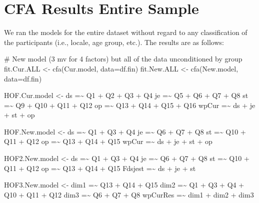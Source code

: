 \documentclass[
  letterpaper,
  DIV=11,
  numbers=noendperiod]{scrartcl}
\newenvironment{Shaded}{\begin{snugshade}}{\end{snugshade}}
\newcommand{\AttributeTok}[1]{\textcolor[rgb]{0.40,0.45,0.13}{#1}}
\newcommand{\CommentTok}[1]{\textcolor[rgb]{0.37,0.37,0.37}{#1}}
\newcommand{\FunctionTok}[1]{\textcolor[rgb]{0.28,0.35,0.67}{#1}}
\newcommand{\NormalTok}[1]{\textcolor[rgb]{0.00,0.23,0.31}{#1}}
\newcommand{\OtherTok}[1]{\textcolor[rgb]{0.00,0.23,0.31}{#1}}
\newcommand{\StringTok}[1]{\textcolor[rgb]{0.13,0.47,0.30}{#1}}
\begin{document}
\section{CFA Results Entire Sample}\label{cfa-results-entire-sample}

We ran the models for the entire dataset without regard to any
classification of the participants (i.e., locale, age group, etc.). The
results are as follows:

\begin{Shaded}
\begin{Highlighting}[]
\CommentTok{\# New model (3 mv for 4 factors) but all of the data unconditioned by group}
\NormalTok{fit.Cur.ALL }\OtherTok{\textless{}{-}} \FunctionTok{cfa}\NormalTok{(Cur.model, }\AttributeTok{data=}\NormalTok{df.fin)}
\NormalTok{fit.New.ALL }\OtherTok{\textless{}{-}} \FunctionTok{cfa}\NormalTok{(New.model, }\AttributeTok{data=}\NormalTok{df.fin)}

\NormalTok{HOF.Cur.model }\OtherTok{\textless{}{-}}  \StringTok{\textquotesingle{}ds =\textasciitilde{} Q1 + Q2 + Q3 + Q4}
\StringTok{                  je =\textasciitilde{} Q5 + Q6 + Q7 + Q8}
\StringTok{                  st =\textasciitilde{} Q9 + Q10 + Q11 + Q12}
\StringTok{                  op =\textasciitilde{} Q13 + Q14 + Q15 + Q16}
\StringTok{                  wpCur =\textasciitilde{} ds + je + st + op\textquotesingle{}}

\NormalTok{HOF.New.model }\OtherTok{\textless{}{-}} \StringTok{\textquotesingle{}ds =\textasciitilde{} Q1 + Q3 + Q4}
\StringTok{                  je =\textasciitilde{} Q6 + Q7 + Q8}
\StringTok{                  st =\textasciitilde{} Q10 + Q11 + Q12}
\StringTok{                  op =\textasciitilde{} Q13 + Q14 + Q15}
\StringTok{                  wpCur =\textasciitilde{} ds + je + st + op\textquotesingle{}}

\NormalTok{HOF2.New.model }\OtherTok{\textless{}{-}} \StringTok{\textquotesingle{}ds =\textasciitilde{} Q1 + Q3 + Q4}
\StringTok{                  je =\textasciitilde{} Q6 + Q7 + Q8}
\StringTok{                  st =\textasciitilde{} Q10 + Q11 + Q12}
\StringTok{                  op =\textasciitilde{} Q13 + Q14 + Q15}
\StringTok{                  Fdsjest =\textasciitilde{} ds + je + st\textquotesingle{}}

\NormalTok{HOF3.New.model }\OtherTok{\textless{}{-}} \StringTok{\textquotesingle{}dim1 =\textasciitilde{} Q13 + Q14 + Q15}
\StringTok{                  dim2 =\textasciitilde{} Q1 + Q3 + Q4 + Q10 + Q11 + Q12}
\StringTok{                  dim3 =\textasciitilde{} Q6 + Q7 + Q8}
\StringTok{                  wpCurRes =\textasciitilde{} dim1 + dim2 + dim3\textquotesingle{}}


\end{Highlighting}
\end{Shaded}
\end{document}
